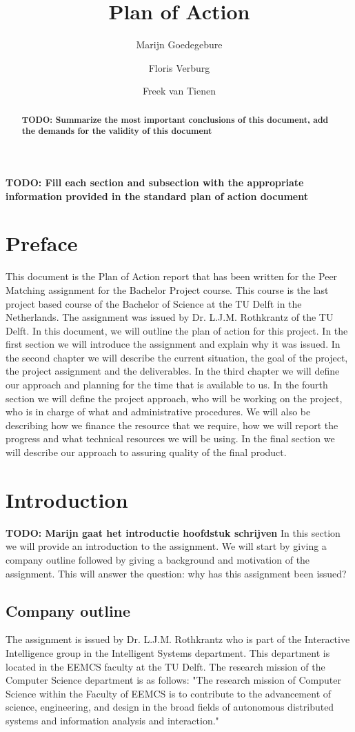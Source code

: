 \documentclass[]{article}
\title{Plan of Action}
\author{Marijn Goedegebure \and
	Floris Verburg \and
	Freek van Tienen}
\date{}
\newcommand{\TODO}[1]{{\color{red}\textbf{TODO: #1}}}
\begin{document}
\maketitle

\begin{abstract}
\TODO{Summarize the most important conclusions of this document, add the demands for the validity of this document}
\end{abstract}

\newpage

\tableofcontents

\newpage
\TODO{Fill each section and subsection with the appropriate information provided in the standard plan of action document}
\section{Preface}
This document is the Plan of Action report that has been written for the Peer Matching assignment for the Bachelor Project course.
This course is the last project based course of the Bachelor of Science at the TU Delft in the Netherlands.
The assignment was issued by Dr. L.J.M. Rothkrantz of the TU Delft.
In this document, we will outline the plan of action for this project.
In the first section we will introduce the assignment and explain why it was issued.
In the second chapter we will describe the current situation, the goal of the project, the project assignment and the deliverables.
In the third chapter we will define our approach and planning for the time that is available to us.
In the fourth section we will define the project approach, who will be working on the project, who is in charge of what and administrative procedures.
We will also be describing how we finance the  resource that we require, how we will report the progress and what technical resources we will be using.
In the final section we will describe our approach to assuring quality of the final product.
\section{Introduction}
\TODO{Marijn gaat het introductie hoofdstuk schrijven}
In this section we will provide an introduction to the assignment.
We will start by giving a company outline followed by giving a background and motivation of the assignment.
This will answer the question: why has this assignment been issued? 
\subsection{Company outline}
The assignment is issued by Dr. L.J.M. Rothkrantz who is part of the Interactive Intelligence group in the Intelligent Systems department.
This department is located in the EEMCS faculty at the TU Delft.
The research mission of the Computer Science department is as follows:
"The research mission of Computer Science within the Faculty of EEMCS is to contribute to the advancement of science, engineering, and design in the broad fields of autonomous distributed systems and information analysis and interaction."\cite{cstudelftnl}
\end{document}
